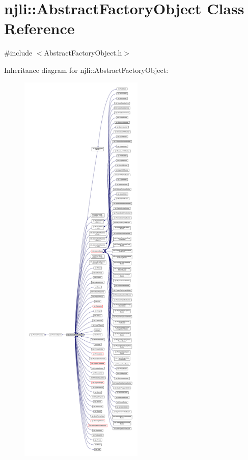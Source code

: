 \hypertarget{classnjli_1_1_abstract_factory_object}{}\section{njli\+:\+:Abstract\+Factory\+Object Class Reference}
\label{classnjli_1_1_abstract_factory_object}


{\ttfamily \#include $<$Abstract\+Factory\+Object.\+h$>$}



Inheritance diagram for njli\+:\+:Abstract\+Factory\+Object\+:\nopagebreak
\begin{figure}[H]
\begin{center}
\leavevmode
\includegraphics[height=550pt]{classnjli_1_1_abstract_factory_object__inherit__graph}
\end{center}
\end{figure}


